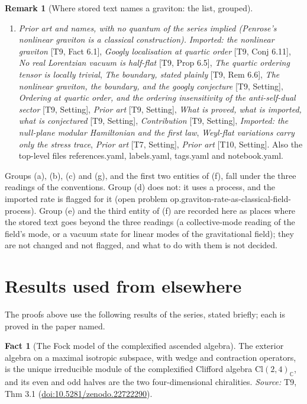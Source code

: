\documentclass[11pt]{article}
\theoremstyle{definition}
\newtheorem{fact}[theorem]{Fact}
\newtheorem{remark}[theorem]{Remark}
\theoremstyle{plain}
\providecommand{\C}{}\renewcommand{\C}{\mathbb{C}}
\providecommand{\Cl}{}\renewcommand{\Cl}{\mathrm{Cl}}
\begin{document}
\begin{remark}[Where stored text names a graviton: the list, grouped]
\begin{enumerate}
\item[(g)] \emph{Prior art and names, with no quantum of the series implied (Penrose's nonlinear graviton is a classical construction).} \emph{Imported: the nonlinear graviton} [T9, Fact 6.1], \emph{Googly localisation at quartic order} [T9, Conj 6.11], \emph{No real Lorentzian vacuum is half-flat} [T9, Prop 6.5], \emph{The quartic ordering tensor is locally trivial}, \emph{The boundary, stated plainly} [T9, Rem 6.6], \emph{The nonlinear graviton, the boundary, and the googly conjecture} [T9, Setting], \emph{Ordering at quartic order, and the ordering insensitivity of the anti-self-dual sector} [T9, Setting], \emph{Prior art} [T9, Setting], \emph{What is proved, what is imported, what is conjectured} [T9, Setting], \emph{Contribution} [T9, Setting], \emph{Imported: the null-plane modular Hamiltonian and the first law}, \emph{Weyl-flat variations carry only the stress trace}, \emph{Prior art} [T7, Setting], \emph{Prior art} [T10, Setting]. Also the top-level files references.yaml, labels.yaml, tags.yaml and notebook.yaml.
\end{enumerate}
Groups (a), (b), (c) and (g), and the first two entities of (f), fall under the three readings of the conventions. Group (d) does not: it uses a process, and the imported rate is flagged for it (open problem op.graviton-rate-as-classical-field-process). Group (e) and the third entity of (f) are recorded here as places where the stored text goes beyond the three readings (a collective-mode reading of the field's mode, or a vacuum state for linear modes of the gravitational field); they are not changed and not flagged, and what to do with them is not decided.
\end{remark}

\section{Results used from elsewhere}
The proofs above use the following results of the series, stated briefly; each is proved in the paper named.

\begin{fact}[The Fock model of the complexified ascended algebra]\label{c:correspondence.fock-model-complexified-ascended-algebra}
The exterior algebra on a maximal isotropic subspace, with wedge and contraction operators, is the unique irreducible module of the complexified Clifford algebra $\Cl(2,4)_\C$, and its even and odd halves are the two four-dimensional chiralities.
\emph{Source:} T9, Thm 3.1 (\href{https://doi.org/10.5281/zenodo.22722290}{doi:10.5281/zenodo.22722290}).
\end{fact}
\end{document}
